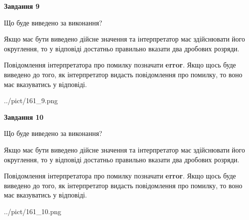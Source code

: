 \documentclass[12pt, ukrainian]{article}
\begin{document}
{\begin {Large}
{\begin {center}\textbf{Завдання 9}\end {center}}\par
Що буде виведено за виконання? \par

Якщо має бути виведено дійсне значення та інтерпретатор має здійснювати його округлення, 
то у відповіді достатньо правильно вказати два дробових розряди.

Повідомлення інтерпретатора про помилку позначати \textbf{error}.
Якщо щось буде виведено до того, як інтерпретатор видасть повідомлення про помилку, 
то воно має вказуватись у відповіді. \par

\begin{center}
	{../pict/161_9.png}
\end{center}
\newpage

{\begin {center}\textbf{Завдання 10}\end {center}}\par
Що буде виведено за виконання? \par

Якщо має бути виведено дійсне значення та інтерпретатор має здійснювати його округлення, 
то у відповіді достатньо правильно вказати два дробових розряди.

Повідомлення інтерпретатора про помилку позначати \textbf{error}.
Якщо щось буде виведено до того, як інтерпретатор видасть повідомлення про помилку, 
то воно має вказуватись у відповіді. \par

\begin{center}
	{../pict/161_10.png}
\end{center}
\newpage

\end {Large}}
\end{document}
